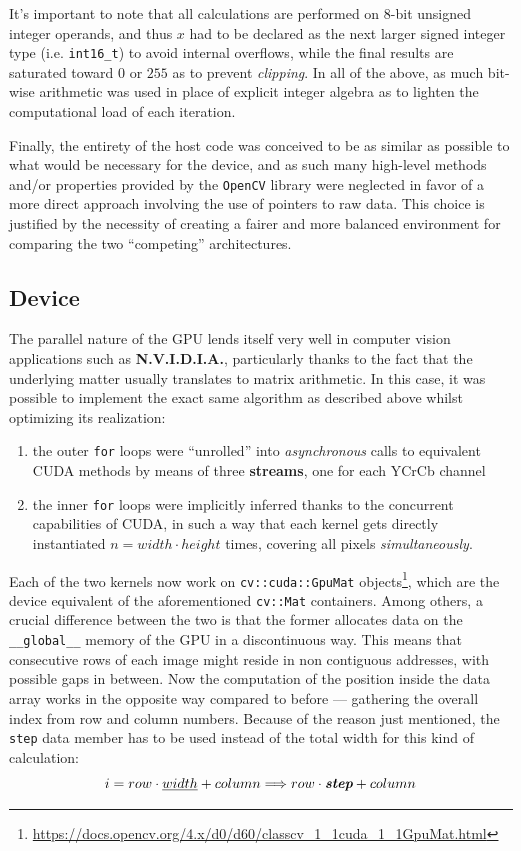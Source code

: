 \documentclass{article}
\begin{document}
It's important to note that all calculations are performed on $8$-bit unsigned integer operands, and thus $x$ had to be declared as the next larger signed integer type (i.e. \texttt{int16\_t}) to avoid internal overflows, while the final results are saturated toward $0$ or $255$ as to prevent \textit{clipping}. In all of the above, as much bit-wise arithmetic was used in place of explicit integer algebra as to lighten the computational load of each iteration.

Finally, the entirety of the host code was conceived to be as similar as possible to what would be necessary for the device, and as such many high-level methods and/or properties provided by the \texttt{OpenCV} library were neglected in favor of a more direct approach involving the use of pointers to raw data. This choice is justified by the necessity of creating a fairer and more balanced environment for comparing the two ``competing'' architectures.

\subsection{Device}
The parallel nature of the GPU lends itself very well in computer vision applications such as \textsf{\textbf{N.V.I.D.I.A.}}, particularly thanks to the fact that the underlying matter usually translates to matrix arithmetic. In this case, it was possible to implement the exact same algorithm as described above whilst optimizing its realization:
\begin{enumerate}
    \item the outer \texttt{for} loops were ``unrolled'' into \textit{asynchronous} calls to equivalent CUDA methods by means of three \textbf{streams}, one for each YCrCb channel
    \item the inner \texttt{for} loops were implicitly inferred thanks to the concurrent capabilities of CUDA, in such a way that each kernel gets directly instantiated $n=width\cdot height$ times, covering all pixels \textit{simultaneously}.
\end{enumerate}

Each of the two kernels now work on \texttt{cv::cuda::GpuMat} objects\footnote{\url{https://docs.opencv.org/4.x/d0/d60/classcv_1_1cuda_1_1GpuMat.html}}, which are the device equivalent of the aforementioned \texttt{cv::Mat} containers. Among others, a crucial difference between the two is that the former allocates data on the \texttt{\_\_global\_\_} memory of the GPU in a discontinuous way. This means that consecutive rows of each image might reside in non contiguous addresses, with possible gaps in between. Now the computation of the position inside the data array works in the opposite way compared to before --- gathering the overall index from row and column numbers. Because of the reason just mentioned, the \texttt{step} data member has to be used instead of the total width for this kind of calculation:
\[i=row\cdot \underline{width}+column\Longrightarrow row\cdot\textit{\textbf{step}}+column\]
\end{document}
